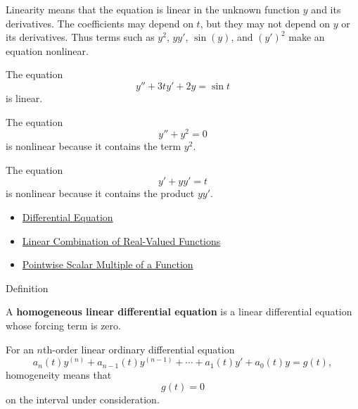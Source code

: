 \begin{remark*}[Interpretation]
Linearity means that the equation is linear in the unknown function $y$ and its derivatives. The coefficients may depend on $t$, but they may not depend on $y$ or its derivatives. Thus terms such as $y^2$, $yy'$, $\sin(y)$, and $(y')^2$ make an equation nonlinear.
\end{remark*}

\begin{remark*}[Examples]
The equation
\[
y''+3t y'+2y=\sin t
\]
is linear.

The equation
\[
y''+y^2=0
\]
is nonlinear because it contains the term $y^2$.

The equation
\[
y'+yy'=t
\]
is nonlinear because it contains the product $yy'$.
\end{remark*}

\begin{dependencies}
\begin{itemize}
  \item \hyperref[def:ordinary-differential-equations-terminology-differential-equation]{Differential Equation}
  \item \hyperref[def:linear-combination-of-real-valued-functions]{Linear Combination of Real-Valued Functions}
  \item \hyperref[def:pointwise-scalar-multiple-of-a-function]{Pointwise Scalar Multiple of a Function}
\end{itemize}
\end{dependencies}


\begin{definitionbox}{Definition}
\begin{definition}
\label{def:ordinary-differential-equations-terminology-homogeneous-linear-differential-equation}
A \textbf{homogeneous linear differential equation} is a linear differential
equation whose forcing term is zero.

For an $n$th-order linear ordinary differential equation
\[
a_n(t)y^{(n)}+a_{n-1}(t)y^{(n-1)}+\cdots+a_1(t)y'+a_0(t)y=g(t),
\]
homogeneity means that
\[
g(t)=0
\]
on the interval under consideration.
\end{definition}
\end{definitionbox}

